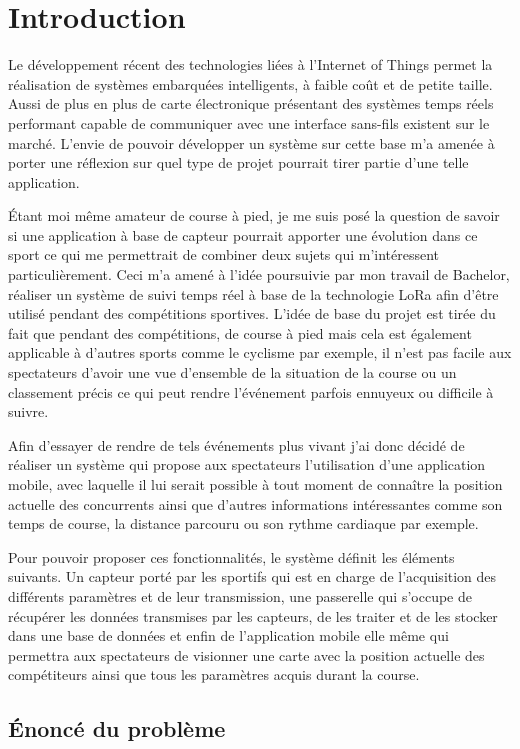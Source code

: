 \chapter{Introduction}

Le développement récent des technologies liées à l'Internet of Things permet la réalisation de systèmes embarquées intelligents, à faible coût et de petite taille. Aussi de plus en plus de carte électronique présentant des systèmes temps réels performant capable de communiquer avec une interface sans-fils existent sur le marché. L'envie de pouvoir développer un système sur cette base m'a amenée à porter une réflexion sur quel type de projet pourrait tirer partie d'une telle application. 

Étant moi même amateur de course à pied, je me suis posé la question de savoir si une application à base de capteur pourrait apporter une évolution dans ce sport ce qui me permettrait de combiner deux sujets qui m'intéressent particulièrement. Ceci m'a amené à l'idée poursuivie par mon travail de Bachelor, réaliser un système de suivi temps réel à base de la technologie LoRa afin d'être utilisé pendant des compétitions sportives. L'idée de base du projet est tirée du fait que pendant des compétitions, de course à pied mais cela est également applicable à d'autres sports comme le cyclisme par exemple, il n'est pas facile aux spectateurs d'avoir une vue d'ensemble de la situation de la course ou un classement précis ce qui peut rendre l'événement parfois ennuyeux ou difficile à suivre.

Afin d'essayer de rendre de tels événements plus vivant j'ai donc décidé de réaliser un système qui propose aux spectateurs l'utilisation d'une application mobile, avec laquelle il lui serait possible à tout moment de connaître la position actuelle des concurrents ainsi que d'autres informations intéressantes comme son temps de course, la distance parcouru ou son rythme cardiaque par exemple. 

Pour pouvoir proposer ces fonctionnalités, le système définit les éléments suivants. Un capteur porté par les sportifs qui est en charge de l'acquisition des différents paramètres et de leur transmission, une passerelle qui s'occupe de récupérer les données transmises par les capteurs, de les traiter et de les stocker dans une base de données et enfin de l'application mobile elle même qui permettra aux spectateurs de visionner une carte avec la position actuelle des compétiteurs ainsi que tous les paramètres acquis durant la course.


\section{Énoncé du problème}

\todo{}